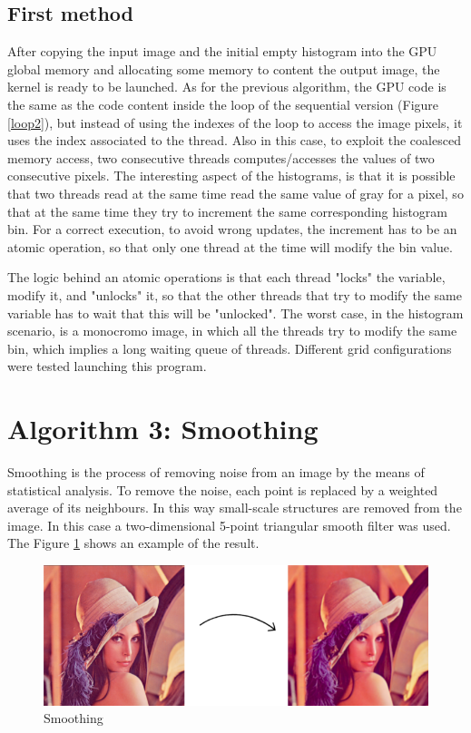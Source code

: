 \documentclass[a4paper]{article}
\begin{document}
\subsection{First method}
\label{sec:fm2}
After copying the input image and the initial empty histogram into the GPU global memory and allocating some memory to content the output image, the kernel is ready to be launched. As for the previous algorithm, the GPU code is the same as the code content inside the loop of the sequential version (Figure \ref{loop2}), but instead of using the indexes of the loop to access the image pixels, it uses the index associated to the thread. Also in this case, to exploit the coalesced memory access, two consecutive threads computes/accesses the values of two consecutive pixels. The interesting aspect of the histograms, is that it is possible that two threads read at the same time read the same value of gray for a pixel, so that at the same time they try to increment the same corresponding histogram bin. For a correct execution, to avoid wrong updates, the increment has to be an atomic operation, so that only one thread at the time will modify the bin value. 

The logic behind an atomic operations is that each thread "locks" the variable, modify it, and "unlocks" it, so that the other threads that try to modify the same variable has to wait that this will be "unlocked". The worst case, in the histogram scenario, is a monocromo image, in which all the threads try to modify the same bin, which implies a long waiting queue of threads.
 Different grid configurations were tested launching this program. 


\section{Algorithm 3: Smoothing}
\label{sec:smoo}
Smoothing is the process of removing noise from an image by the means of statistical analysis. To remove the noise, each point is replaced by a weighted average of its neighbours. In this way small-scale structures are removed from the image. In this case a two-dimensional 5-point triangular smooth filter was used. The Figure \ref{fig:smooth} shows an example of the result.

\begin{figure}[ht]
    \centering
    \includegraphics[width=0.5\linewidth]{smooth}
    \caption{Smoothing}
    \label{fig:smooth}
\end{figure}
\FloatBarrier
\end{document}
